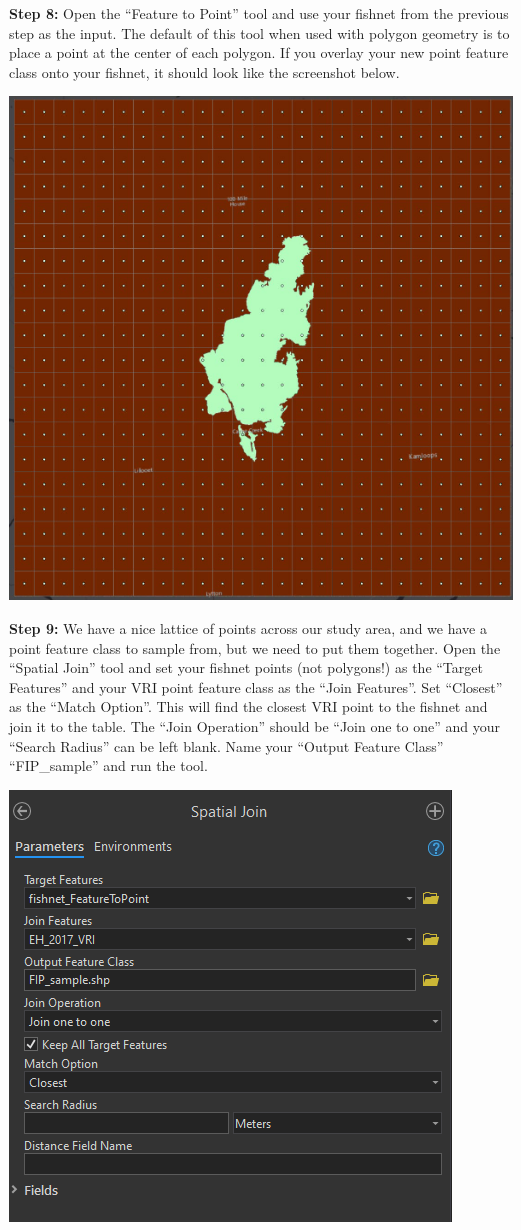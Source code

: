 \documentclass[
]{book}
\begin{document}
\textbf{Step 8:} Open the ``Feature to Point'' tool and use your fishnet from the previous step as the input. The default of this tool when used with polygon geometry is to place a point at the center of each polygon. If you overlay your new point feature class onto your fishnet, it should look like the screenshot below.

\includegraphics[width=0.75\linewidth]{images/04-elephant-hill-fishnet-points}

\textbf{Step 9:} We have a nice lattice of points across our study area, and we have a point feature class to sample from, but we need to put them together. Open the ``Spatial Join'' tool and set your fishnet points (not polygons!) as the ``Target Features'' and your VRI point feature class as the ``Join Features''. Set ``Closest'' as the ``Match Option''. This will find the closest VRI point to the fishnet and join it to the table. The ``Join Operation'' should be ``Join one to one'' and your ``Search Radius'' can be left blank. Name your ``Output Feature Class'' ``FIP\_sample'' and run the tool.

\includegraphics[width=0.75\linewidth]{images/04-spatial-join}
\end{document}
